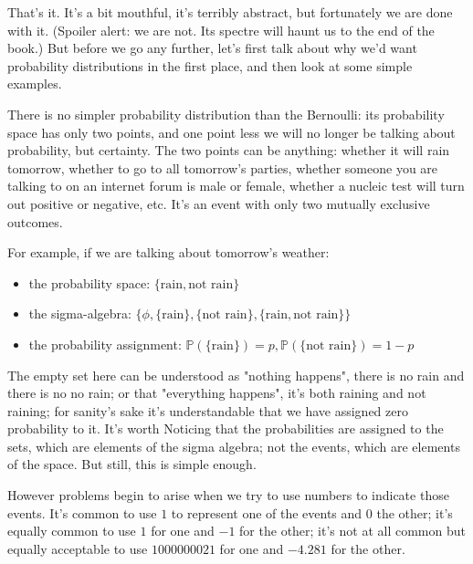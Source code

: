 \documentclass[11pt]{article}
\begin{document}
That's it. It's a bit mouthful, it's terribly abstract, but fortunately we are done with it. (Spoiler alert: we are not. Its spectre will haunt us to the end of the book.) But before we go any further, let's first talk about why we'd want probability distributions in the first place, and then look at some simple examples.

There is no simpler probability distribution than the Bernoulli: its probability space has only two points, and one point less we will no longer be talking about probability, but certainty. The two points can be anything: whether it will rain tomorrow, whether to go to all tomorrow's parties, whether someone you are talking to on an internet forum is male or female, whether a nucleic test will turn out positive or negative, etc. It's an event with only two mutually exclusive outcomes.

For example, if we are talking about tomorrow's weather:

\begin{itemize}
\item the probability space: \(\{\text{rain}, \text{not rain} \}\)
\item the sigma-algebra: \(\{ \phi, \{\text{rain} \}, \{\text{not rain} \}, \{\text{rain}, \text{not rain} \} \}\)
\item the probability assignment: \(\mathbb{P}(\{\text{rain}\}) = p, \mathbb{P}(\{\text{not rain} \}) = 1- p\)
\end{itemize}

The empty set here can be understood as "nothing happens", there is no rain and there is no no rain; or that "everything happens", it's both raining and not raining; for sanity's sake it's understandable that we have assigned zero probability to it. It's worth Noticing that the probabilities are assigned to the sets, which are elements of the sigma algebra; not the events, which are elements of the space. But still, this is simple enough.

However problems begin to arise when we try to use numbers to indicate those events. It's common to use \(1\) to represent one of the events and \(0\) the other; it's equally common to use \(1\) for one and \(-1\) for the other; it's not at all common but equally acceptable to use \(1000000021\) for one and \(-4.281\) for the other.
\end{document}
